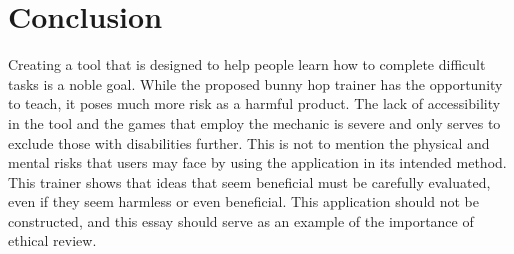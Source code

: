 \documentclass[10pt,twocolumn]{article}
\begin{document}
\section{Conclusion}
Creating a tool that is designed to help people learn how to complete difficult tasks is a noble goal. While the proposed bunny hop trainer has the opportunity to teach, it poses much more risk as a harmful product. The lack of accessibility in the tool and the games that employ the mechanic is severe and only serves to exclude those with disabilities further. This is not to mention the physical and mental risks that users may face by using the application in its intended method. This trainer shows that ideas that seem beneficial must be carefully evaluated, even if they seem harmless or even beneficial. This application should not be constructed, and this essay should serve as an example of the importance of ethical review.
    

\printbibliography
\end{document}
